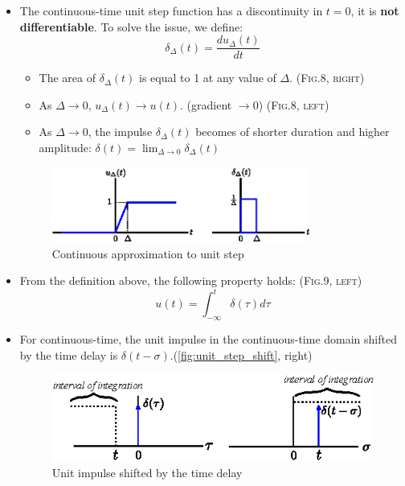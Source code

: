 \begin{itemize}
\item The continuous-time unit step function has a discontinuity in $t=0$, it is \textbf{not differentiable}. To solve the issue, we define:\[ \delta_{\Delta}(t) = \frac{du_{\Delta}(t)}{dt} \]
 \begin{itemize}
 \item The area of $\delta_{\Delta}(t)$ is equal to 1 at any value of $\Delta$. (\textsc{Fig.8, right})
 \item As $\Delta \rightarrow 0$, $u_{\Delta}(t) \rightarrow u(t)$. (gradient $\to 0$) (\textsc{Fig.8, left})

 \item As $\Delta \rightarrow 0$, the impulse $\delta_{\Delta}(t)$ becomes of shorter duration and higher amplitude:
 $ \delta(t) = \lim_{\Delta \to 0} \delta_{\Delta}(t) $
 \end{itemize}
\begin{figure}[h] 
    \centering 
    \includegraphics[width=0.8\textwidth]{images/delta_approx.eps}
    \caption{Continuous approximation to unit step}
\end{figure}
\item From the definition above, the following property holds: (\textsc{Fig.9, left})
\[ u(t) = \int_{-\infty}^{t} \delta(\tau) d\tau \]
\item For continuous-time, the unit impulse in the continuous-time domain shifted by the time delay is $\delta (t-\sigma)$.(\autoref{fig:unit_step_shift}, right)
\begin{figure}[H] 
    \centering
    \includegraphics[width=.8\textwidth]{images/unit_step_shift.eps}
    \caption{Unit impulse shifted by the time delay}
    \label{fig:unit_step_shift}
\end{figure} 
\end{itemize}

